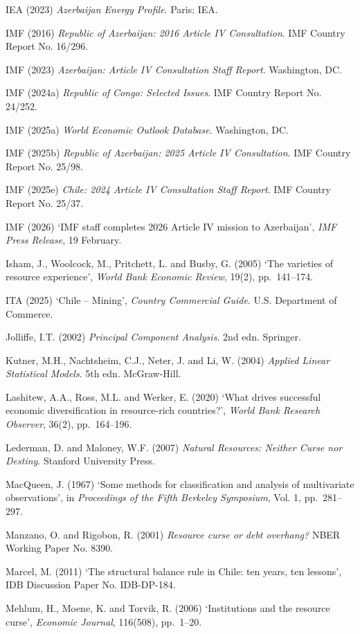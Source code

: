 \documentclass[12pt,a4paper]{report}
\begin{document}
\begin{flushleft}
IEA (2023) \textit{Azerbaijan Energy Profile}. Paris: IEA.

IMF (2016) \textit{Republic of Azerbaijan: 2016 Article IV Consultation}. IMF Country Report No. 16/296.

IMF (2023) \textit{Azerbaijan: Article IV Consultation Staff Report}. Washington, DC.

IMF (2024a) \textit{Republic of Congo: Selected Issues}. IMF Country Report No. 24/252.

IMF (2025a) \textit{World Economic Outlook Database}. Washington, DC.

IMF (2025b) \textit{Republic of Azerbaijan: 2025 Article IV Consultation}. IMF Country Report No. 25/98.

IMF (2025e) \textit{Chile: 2024 Article IV Consultation Staff Report}. IMF Country Report No. 25/37.

IMF (2026) `IMF staff completes 2026 Article IV mission to Azerbaijan', \textit{IMF Press Release}, 19 February.

Isham, J., Woolcock, M., Pritchett, L. and Busby, G. (2005) `The varieties of resource experience', \textit{World Bank Economic Review}, 19(2), pp.~141--174.

ITA (2025) `Chile -- Mining', \textit{Country Commercial Guide}. U.S. Department of Commerce.

Jolliffe, I.T. (2002) \textit{Principal Component Analysis}. 2nd edn. Springer.

Kutner, M.H., Nachtsheim, C.J., Neter, J. and Li, W. (2004) \textit{Applied Linear Statistical Models}. 5th edn. McGraw-Hill.

Lashitew, A.A., Ross, M.L. and Werker, E. (2020) `What drives successful economic diversification in resource-rich countries?', \textit{World Bank Research Observer}, 36(2), pp.~164--196.

Lederman, D. and Maloney, W.F. (2007) \textit{Natural Resources: Neither Curse nor Destiny}. Stanford University Press.

MacQueen, J. (1967) `Some methods for classification and analysis of multivariate observations', in \textit{Proceedings of the Fifth Berkeley Symposium}, Vol. 1, pp.~281--297.

Manzano, O. and Rigobon, R. (2001) \textit{Resource curse or debt overhang?} NBER Working Paper No. 8390.

Marcel, M. (2011) `The structural balance rule in Chile: ten years, ten lessons', IDB Discussion Paper No. IDB-DP-184.

Mehlum, H., Moene, K. and Torvik, R. (2006) `Institutions and the resource curse', \textit{Economic Journal}, 116(508), pp.~1--20.


\end{flushleft}
\end{document}
